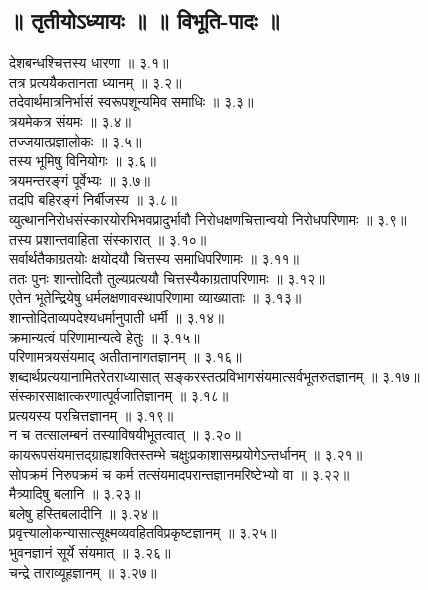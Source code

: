 \begin{multicols}{2}
\section*{॥ तृतीयोऽध्यायः ॥  ॥ विभूति-पादः ॥}
\begin{flushleft}
\devanagarifont
देशबन्धश्चित्तस्य धारणा ॥ ३.१॥\\
तत्र प्रत्ययैकतानता ध्यानम् ॥ ३.२॥\\
तदेवार्थमात्रनिर्भासं स्वरूपशून्यमिव समाधिः ॥ ३.३॥\\
त्रयमेकत्र संयमः ॥ ३.४॥\\
तज्जयात्प्रज्ञालोकः ॥ ३.५॥\\
तस्य भूमिषु विनियोगः ॥ ३.६॥\\
त्रयमन्तरङ्गं पूर्वेभ्यः ॥ ३.७॥\\
तदपि बहिरङ्गं निर्बीजस्य ॥ ३.८॥\\
व्युत्थाननिरोधसंस्कारयोरभिभवप्रादुर्भावौ निरोधक्षणचित्तान्वयो निरोधपरिणामः ॥ ३.९॥\\
तस्य प्रशान्तवाहिता संस्कारात् ॥ ३.१०॥\\
सर्वार्थतैकाग्रतयोः क्षयोदयौ चित्तस्य समाधिपरिणामः ॥ ३.११॥\\
ततः पुनः शान्तोदितौ तुल्यप्रत्ययौ चित्तस्यैकाग्रतापरिणामः ॥ ३.१२॥\\
एतेन भूतेन्द्रियेषु धर्मलक्षणावस्थापरिणामा व्याख्याताः ॥ ३.१३॥\\
शान्तोदिताव्यपदेश्यधर्मानुपाती धर्मी ॥ ३.१४॥\\
क्रमान्यत्वं परिणामान्यत्वे हेतुः ॥ ३.१५॥\\
परिणामत्रयसंयमाद् अतीतानागतज्ञानम् ॥ ३.१६॥\\
शब्दार्थप्रत्ययानामितरेतराध्यासात् सङ्करस्तत्प्रविभागसंयमात्सर्वभूतरुतज्ञानम् ॥ ३.१७॥\\
संस्कारसाक्षात्करणात्पूर्वजातिज्ञानम् ॥ ३.१८॥\\
प्रत्ययस्य परचित्तज्ञानम् ॥ ३.१९॥\\
न च तत्सालम्बनं तस्याविषयीभूतत्वात् ॥ ३.२०॥\\
कायरूपसंयमात्तद्ग्राह्यशक्तिस्तम्भे चक्षुःप्रकाशासम्प्रयोगेऽन्तर्धानम् ॥ ३.२१॥\\
सोपक्रमं निरुपक्रमं च कर्म तत्संयमादपरान्तज्ञानमरिष्टेभ्यो वा ॥ ३.२२॥\\
मैत्र्यादिषु बलानि ॥ ३.२३॥\\
बलेषु हस्तिबलादीनि ॥ ३.२४॥\\
प्रवृत्त्यालोकन्यासात्सूक्ष्मव्यवहितविप्रकृष्टज्ञानम् ॥ ३.२५॥\\
भुवनज्ञानं सूर्ये संयमात् ॥ ३.२६॥\\
चन्द्रे ताराव्यूहज्ञानम् ॥ ३.२७॥\\

\end{flushleft}
\end{multicols}
